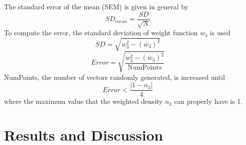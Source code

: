 \documentclass[double,12pt]{beavtex}
\begin{document}
 \begin{figure}[h!]
    \centering
    \label{fig:AntitheticVariate}
  \end{figure} 

The standard error of the mean (SEM) is given in general by
\begin{equation}{SD_{mean}=\frac{SD}{\sqrt{N}}}\end{equation} 
To compute the error, the standard deviation of weight function $w_3$ is used 
\begin{equation}SD=\sqrt{\overline{w_3^2}-(\overline{w}_3)^2}\end{equation} 
\begin{equation}{Error=\sqrt{\frac{\overline{w_3^2}-(\overline{w}_3)^2}{\text{NumPoints}}}}\end{equation} 
NumPoints, the number of vectors randomly generated, is increased until
\begin{equation}{Error<\frac{|1-n_3|}{4}}\end{equation}
where the maximum value that the weighted density $n_3$ 
can properly have is 1.


\chapter{Results and Discussion}
\end{document}
